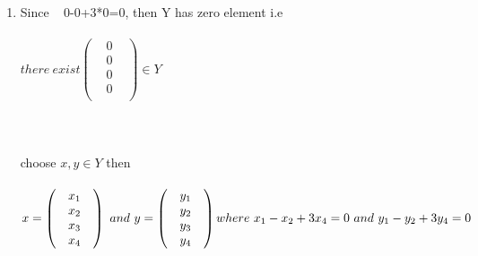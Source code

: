 \documentclass[45pt]{article}
\begin{document}
\Large{}
\begin{enumerate}
    \item Since ~ 0-0+3*0=0, then Y has zero element i.e \\ \\
$ there ~ exist \begin{pmatrix}
    & 0  \\
    & 0 & \\
    & 0 & \\
    & 0 & \\
    \end{pmatrix}
    \in Y
      $ \\\\
 \\ \\ 

choose $x, y \in Y$ then \\\\
$x = \begin{pmatrix}
    & x_1  \\
    & x_2 & \\
    & x_3 & \\
    & x_4 & \\
    \end{pmatrix} ~ and ~ y=  \begin{pmatrix}
    & y_1  \\
    & y_2 & \\
    & y_3 & \\
    & y_4 & \\
    \end{pmatrix} \\\\
    where ~ x_1-x_2+3x_4=0 ~ and ~ y_1-y_2+3y_4=0
      $ \\\\


\end{enumerate}
\end{document}
